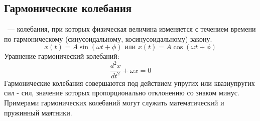 \subsection{Гармонические колебания}
~--- колебания, при которых физическая величина изменяется с течением времени по гармоническому (синусоидальному, косинусоидальному) закону.
\begin{equation}
x(t) = A \sin (\omega t + \phi) \text { или } x(t) = A \cos (\omega t + \phi)
\end{equation}
Уравнение гармонический колебаний:
\begin{equation}
\frac{d^2 x}{d t^2} + \omega x = 0
\end{equation}
Гармонические колебания совершаются под действием упругих или квазиупругих сил - сил, значение которых пропорционально отклонению со знаком минус. Примерами гармонических колебаний могут служить математический и пружинный маятники.